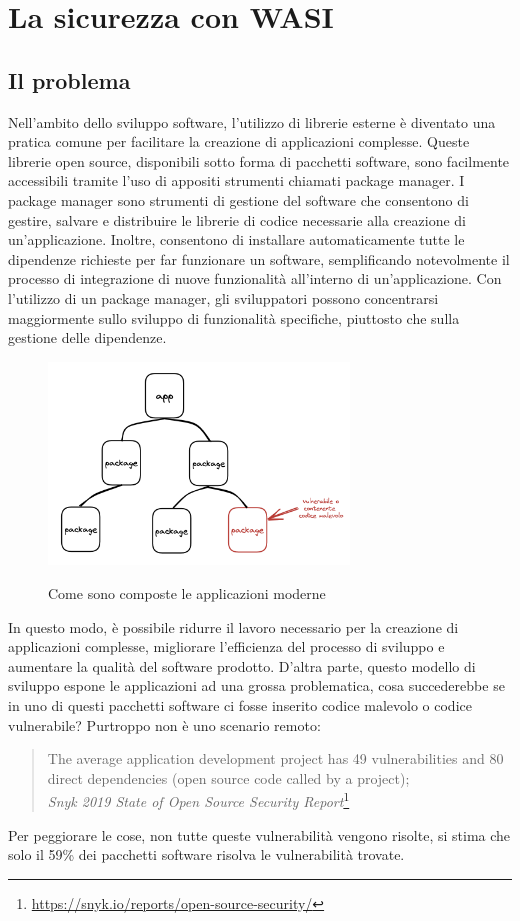 \section{La sicurezza con WASI}
\subsection{Il problema}
\label{sec:security-problem}
Nell'ambito dello sviluppo software, l'utilizzo di librerie esterne è diventato una pratica comune per facilitare la
creazione di applicazioni complesse. Queste librerie open source, disponibili sotto forma di pacchetti software, sono
facilmente accessibili tramite l'uso di appositi strumenti chiamati package manager. I package manager sono strumenti di
gestione del software che consentono di gestire, salvare e distribuire le librerie di codice necessarie alla creazione
di un'applicazione. Inoltre, consentono di installare automaticamente tutte le dipendenze richieste per far funzionare
un software, semplificando notevolmente il processo di integrazione di nuove funzionalità all'interno di
un'applicazione. Con l'utilizzo di un package manager, gli sviluppatori possono concentrarsi maggiormente sullo sviluppo
di funzionalità specifiche, piuttosto che sulla gestione delle dipendenze.
\begin{figure}[h]
    \centering
    \captionsetup{justification=centering}
    \includegraphics[width=8cm]{./chapters/2.wasi-in-depth/images/1.malicious_or_vuln_code.png}
    \label{app_package}
    \caption{Come sono composte le applicazioni moderne}
\end{figure}
In questo modo, è possibile ridurre il lavoro necessario per la creazione di applicazioni complesse, migliorare
l'efficienza del processo di sviluppo e aumentare la qualità del software prodotto. D'altra parte, questo modello di
sviluppo espone le applicazioni ad una grossa problematica, cosa succederebbe se in uno di questi pacchetti software ci
fosse inserito codice malevolo o codice vulnerabile? Purtroppo non è uno scenario remoto:
\begin{quote}
    The average application development project has 49 vulnerabilities and 80 direct dependencies (open source code
    called by a project); \\
    \textit{Snyk 2019 State of Open Source Security
    Report}\footnote{\url{https://snyk.io/reports/open-source-security/}}
\end{quote}
Per peggiorare le cose, non tutte queste vulnerabilità vengono risolte, si stima che solo il 59\% dei pacchetti software
risolva le vulnerabilità trovate.
